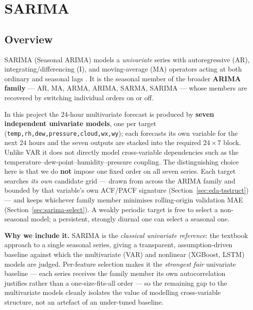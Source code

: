 \documentclass[12pt,a4paper,oneside]{report}
\begin{document}
\section{SARIMA}
\label{sec:sarima}
\subsection{Overview}
SARIMA (Seasonal ARIMA) models a \emph{univariate} series with autoregressive
(AR), integrating/differencing (I), and moving-average (MA) operators acting at
both ordinary and seasonal lags \citep{box2015time,hyndman2021fpp}. It is the
seasonal member of the broader \textbf{ARIMA family} --- AR, MA, ARMA, ARIMA,
SARMA, SARIMA --- whose members are recovered by switching individual orders on
or off.

In this project the $24$-hour multivariate forecast is produced by
\textbf{seven independent univariate models}, one per target
(\texttt{temp,rh,dew,pressure,cloud,wx,wy}); each forecasts its own variable for
the next $24$ hours and the seven outputs are stacked into the required
$24 \times 7$ block. Unlike VAR it does not directly model cross-variable
dependencies such as the temperature--dew-point--humidity--pressure coupling.
The distinguishing choice here is that we do \textbf{not} impose one fixed order
on all seven series. Each target searches \emph{its own} candidate grid --- drawn
from across the ARIMA family and bounded by that variable's own ACF/PACF
signature (Section~\ref{sec:eda-tsstruct}) --- and keeps whichever family member
minimises rolling-origin validation MAE (Section~\ref{sec:sarima-select}). A
weakly periodic target is free to select a non-seasonal model; a persistent,
strongly diurnal one can select a seasonal one.

\textbf{Why we include it.} SARIMA is the \emph{classical univariate reference}:
the textbook approach to a single seasonal series, giving a transparent,
assumption-driven baseline against which the multivariate (VAR) and nonlinear
(XGBoost, LSTM) models are judged. Per-feature selection makes it the
\emph{strongest fair} univariate baseline --- each series receives the family
member its own autocorrelation justifies rather than a one-size-fits-all order
--- so the remaining gap to the multivariate models cleanly isolates the value of
modelling cross-variable structure, not an artefact of an under-tuned baseline.
\end{document}
